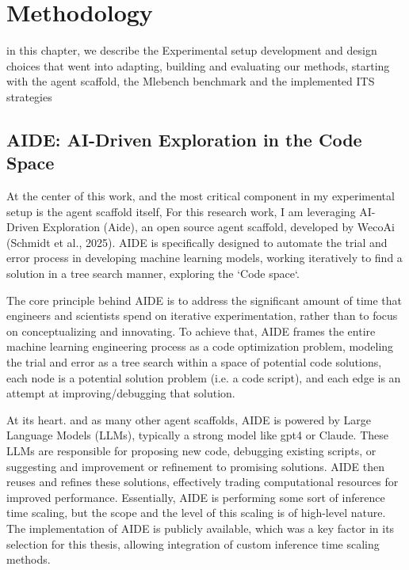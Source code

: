 \chapter{Methodology}
in this chapter, we describe the Experimental setup development and design choices that went into adapting, building and evaluating our methods, starting with the agent scaffold, the Mlebench benchmark and the implemented ITS strategies

\section{AIDE: AI-Driven Exploration in the Code Space}
At the center of this work, and the most critical component in my experimental setup is the agent scaffold itself, For this research work, I am leveraging AI-Driven Exploration (Aide), an open source agent scaffold, developed by WecoAi (Schmidt et al., 2025). AIDE is specifically designed to automate the trial and error process in developing machine learning models, working iteratively to find a solution in a tree search manner, exploring the `Code space`. 

The core principle behind AIDE is to address the significant amount of time that engineers and scientists spend on iterative experimentation, rather than to focus on conceptualizing and innovating.  To achieve that, AIDE frames the entire machine learning engineering process as a code optimization problem, modeling the trial and error as a tree search within a space of potential code solutions, each node is a potential solution problem (i.e. a code script), and each edge is an attempt at improving/debugging that solution.

At its heart. and as many other agent scaffolds, AIDE is powered by Large Language Models (LLMs), typically a strong model like gpt4 or Claude. These LLMs are responsible for proposing new code, debugging existing scripts, or suggesting and improvement or refinement to promising solutions. AIDE then reuses and refines these solutions, effectively trading computational resources for improved performance. Essentially, AIDE is performing some sort of inference time scaling, but the scope and the level of this scaling is of high-level nature. The implementation of AIDE is publicly available, which was a key factor in its selection for this thesis, allowing integration of custom inference time scaling methods.

